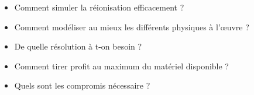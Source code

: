 \begin{itemize}
\item Comment simuler la réionisation efficacement ?
\item Comment modéliser au mieux les différents physiques à l’œuvre ?
\item De quelle résolution à t-on besoin ?
\item Comment tirer profit au maximum du matériel disponible ?
\item Quels sont les compromis nécessaire ?
\end{itemize}

%
%
%




